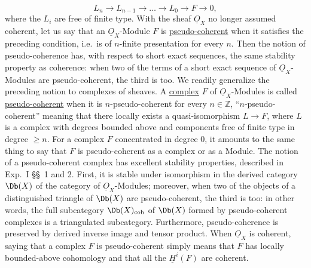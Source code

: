 %
\[
  L_n\longrightarrow L_{n-1}\longrightarrow \ldots \longrightarrow L_0\longrightarrow F\longrightarrow 0,
\]
where the \(L_i\) are free of finite type. With the sheaf \(\underline{O}_X\) no longer assumed coherent, let us say that an \(\underline{O}_X\)-Module \(F\) is \uline{pseudo-coherent} when it satisfies the preceding condition, i.e.\ is of \(n\)-finite presentation for every \(n\). Then the notion of pseudo-coherence has, with respect to short exact sequences, the same stability property as coherence: when two of the terms of a short exact sequence of \(\underline{O}_X\)-Modules are pseudo-coherent, the third is too. We readily generalize the preceding notion to complexes of sheaves. A \uline{complex} \(F\) of \(\underline{O}_X\)-Modules is called \uline{pseudo-coherent} when it is \(n\)-pseudo-coherent for every \(n\in\mathbb Z\), ``\(n\)-pseudo-coherent'' meaning that there locally exists a quasi-isomorphism \(L\to F\), where \(L\) is a complex with degrees bounded above and components free of finite type in degree \(\geq n\). For a complex \(F\) concentrated in degree \(0\), it amounts to the same thing to say that \(F\) is pseudo-coherent as a complex or as a Module. The notion of a pseudo-coherent complex has excellent stability properties, described in Exp.\ I \S\S~1 and 2. First, it is stable under isomorphism in the derived category \(\Db(X)\) of the category of \(\underline{O}_X\)-Modules; moreover, when two of the objects of a distinguished triangle of \(\Db(X)\) are pseudo-coherent, the third is too: in other words, the full subcategory \(\Db(X)_{\mathrm{coh}}\) of \(\Db(X)\) formed by pseudo-coherent complexes is a triangulated subcategory. Furthermore, pseudo-coherence is preserved by derived inverse image and tensor product. When \(\underline{O}_X\) is coherent, saying that a complex \(F\) is pseudo-coherent simply means that \(F\) has locally bounded-above cohomology and that all the \(\underline H^i(F)\) are coherent.

